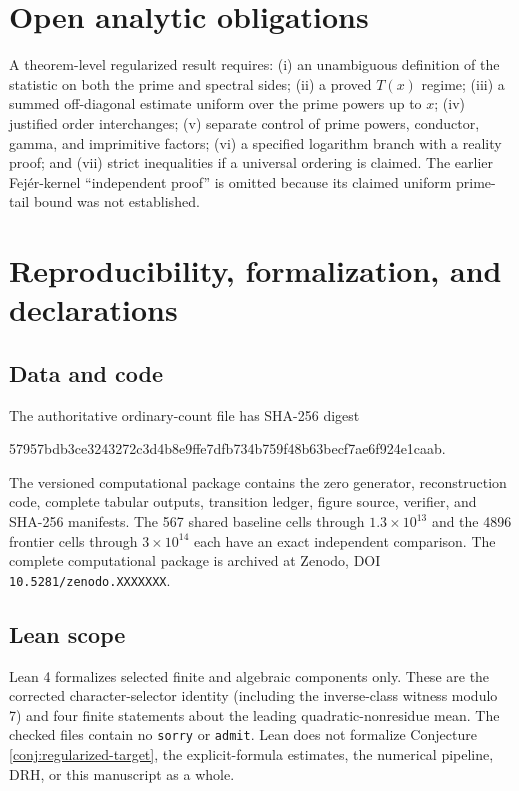 \documentclass[12pt,reqno]{amsart}
\theoremstyle{definition}
\theoremstyle{remark}
\numberwithin{equation}{section}
\begin{document}
\section{Open analytic obligations}
\label{sec:open-obligations}

A theorem-level regularized result requires: (i) an unambiguous definition of
the statistic on both the prime and spectral sides; (ii) a proved $T(x)$
regime; (iii) a summed off-diagonal estimate uniform over the prime powers up
to $x$; (iv) justified order interchanges; (v) separate control of prime powers,
conductor, gamma, and imprimitive factors; (vi) a specified logarithm branch
with a reality proof; and (vii) strict inequalities if a universal ordering is
claimed.  The earlier Fej\'er-kernel ``independent proof'' is omitted because
its claimed uniform prime-tail bound was not established.

\section{Reproducibility, formalization, and declarations}

\subsection{Data and code}

The authoritative ordinary-count file has SHA-256 digest
\begin{center}
\ttfamily\footnotesize
57957bdb3ce3243272c3d4b8e9ffe7dfb734b759f48b63becf7ae6f924e1caab.
\end{center}
The versioned computational package contains the zero generator,
reconstruction code, complete tabular outputs, transition ledger, figure
source, verifier, and SHA-256 manifests.  The 567 shared baseline cells
through $1.3\times10^{13}$ and the 4896 frontier cells through
$3\times10^{14}$ each have an exact independent comparison.  The complete
computational package is archived at
Zenodo, DOI \texttt{10.5281/zenodo.XXXXXXX}.

\subsection{Lean scope}

Lean 4 formalizes selected finite and algebraic components only.  These are
the corrected character-selector identity (including the inverse-class
witness modulo 7) and four finite statements about the leading
quadratic-nonresidue mean.  The checked files contain no \texttt{sorry} or
\texttt{admit}.  Lean does not formalize Conjecture
\ref{conj:regularized-target}, the explicit-formula estimates, the numerical
pipeline, DRH, or this manuscript as a whole.
\end{document}
